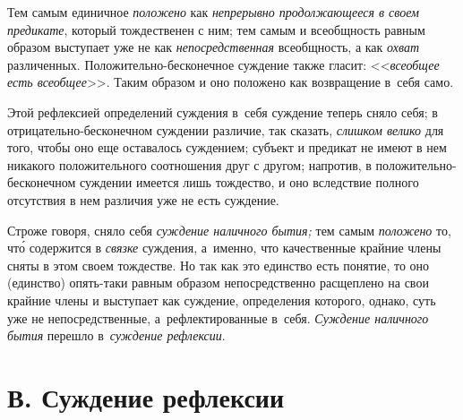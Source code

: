 Тем самым единичное {\em положено} как {\em непрерывно продолжающееся в своем
предикате}, который тождественен с ним; тем самым и всеобщность равным образом
выступает уже не как {\em непосредственная} всеобщность, а как {\em охват}
различенных. Положительно-бесконечное суждение также гласит: <<{\em всеобщее
есть всеобщее}>>. Таким образом и оно положено как возвращение в~себя само.

Этой рефлексией определений суждения в~себя суждение теперь сняло себя; в
отрицательно-бесконечном суждении различие, так сказать, {\em слишком велико}
для того, чтобы оно еще оставалось суждением; субъект и предикат не имеют в нем
никакого положительного соотношения друг с другом; напротив, в
положительно-бесконечном суждении имеется лишь тождество, и оно вследствие
полного отсутствия в нем различия уже не есть суждение.

Строже говоря, сняло себя {\em суждение наличного бытия;} тем самым {\em
положено} то, чт\'{о} содержится в {\em связке} суждения, а~именно,
что качественные крайние члены сняты в этом своем тождестве. Но так
как это единство есть понятие, то оно (единство) опять-таки равным образом
непосредственно расщеплено на свои крайние члены и выступает как суждение,
определения которого, однако, суть уже не непосредственные, а~рефлектированные
в~себя. {\em Суждение наличного бытия} перешло в~{\em суждение рефлексии}.

\section[В. Суждение рефлексии]{В. Суждение рефлексии}

